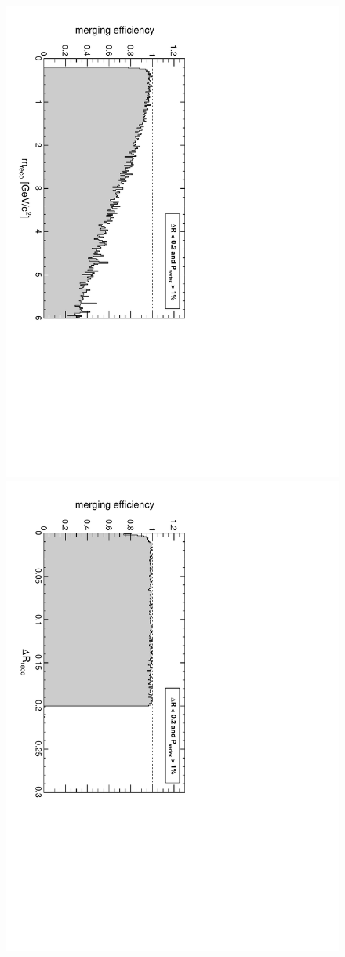 \documentclass[12pt]{article}
\begin{document}
\begin{figure}[p]
\includegraphics[height=0.5\linewidth, angle=90]{fig/acceptance2_plot/mergingeff_recomass_GroupByDeltaRAndVertexProb.pdf}
\includegraphics[height=0.5\linewidth, angle=90]{fig/acceptance2_plot/mergingeff_recodr_GroupByDeltaRAndVertexProb.pdf}


\end{figure}
\end{document}
